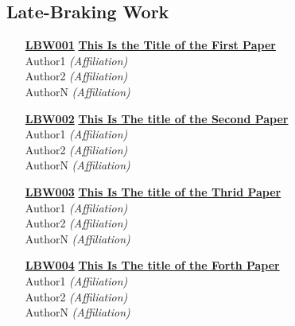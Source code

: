 \subsection{Late-Braking Work}
\begin{enumerate}
\item[\href{https://doi.org/10.1145/1122445.1122456}{\textbf{LBW001}}]
\href{https://doi.org/10.1145/1122445.1122456}{\textbf{This Is the Title of the First Paper}}\\
Author1 \emph{(Affiliation)}\\
Author2 \emph{(Affiliation)}\\
AuthorN \emph{(Affiliation)}\\

\item[\href{https://doi.org/10.1145/1122445.1122456}{\textbf{LBW002}}]
\href{https://doi.org/10.1145/1122445.1122456}{\textbf{This Is The title of the Second Paper}}\\
Author1 \emph{(Affiliation)}\\
Author2 \emph{(Affiliation)}\\
AuthorN \emph{(Affiliation)}\\

\item[\href{https://doi.org/10.1145/1122445.1122456}{\textbf{LBW003}}]
\href{https://doi.org/10.1145/1122445.1122456}{\textbf{This Is The title of the Thrid Paper}}\\
Author1 \emph{(Affiliation)}\\
Author2 \emph{(Affiliation)}\\
AuthorN \emph{(Affiliation)}\\

\item[\href{https://doi.org/10.1145/1122445.1122456}{\textbf{LBW004}}]
\href{https://doi.org/10.1145/1122445.1122456}{\textbf{This Is The title of the Forth Paper}}\\
Author1 \emph{(Affiliation)}\\
Author2 \emph{(Affiliation)}\\
AuthorN \emph{(Affiliation)}\\
\end{enumerate}



